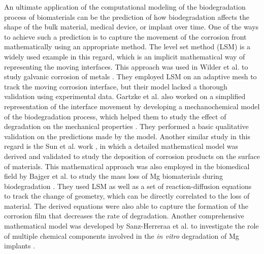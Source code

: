 An ultimate application of the computational modeling of the biodegradation process of biomaterials can be the prediction of how biodegradation affects the shape of the bulk material, medical device, or implant over time. One of the ways to achieve such a prediction is to capture  the movement of the corrosion front mathematically using an appropriate method. The level set method (\gls{LSM}) is a widely used example in this regard, which is an implicit mathematical way of representing the moving interfaces. This approach was used in Wilder et al. to study galvanic corrosion of metals \cite{Wilder2014}. They employed \gls{LSM} on an adaptive mesh to track the moving corrosion interface, but  their model lacked a thorough validation using experimental data.
Gartzke et al. also worked on a simplified representation of the interface movement by developing a mechanochemical model of the biodegradation process, which helped them to study the effect of degradation on the mechanical properties \cite{Gartzke2020}. They performed a basic qualitative validation on the predictions made by the model.
Another similar study in this regard is the Sun et al. work \cite{Sun2012}, in which a detailed mathematical model was derived and validated to study the deposition of  corrosion products on the surface of materials.
This mathematical approach was also employed in the biomedical field by Bajger et al. to study the mass loss of Mg biomaterials during biodegradation \cite{Bajger2016}. They used \gls{LSM} as well as a set of reaction-diffusion equations to track the change of geometry, which can be directly correlated to the loss of material. The derived equations were also able to capture the formation of the corrosion film that decreases the rate of degradation.
Another comprehensive mathematical model was developed by Sanz-Herreraa et al. to investigate the role of multiple chemical components involved in the \textit{in vitro} degradation of Mg implants \cite{Sanz-Herrera2018}.
